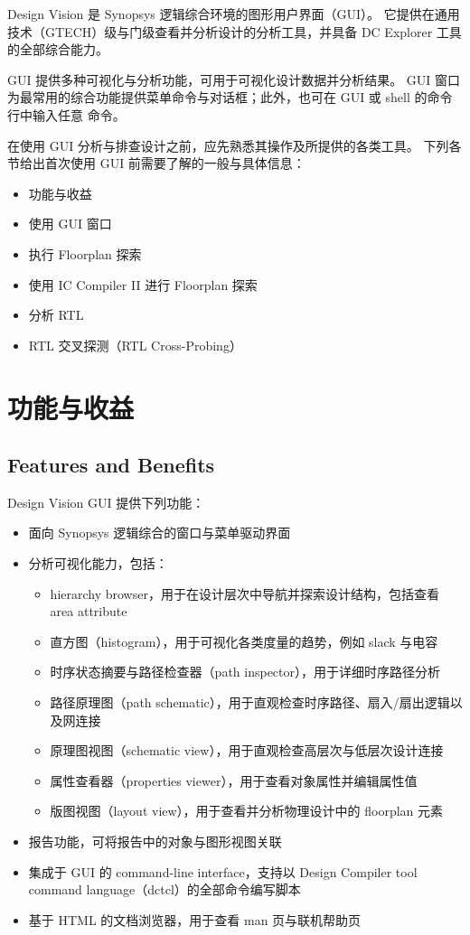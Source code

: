 \label{chap:gui}

Design Vision 是 Synopsys 逻辑综合环境的图形用户界面（GUI）。
它提供在通用技术（GTECH）级与门级查看并分析设计的分析工具，并具备 DC Explorer 工具的全部综合能力。

GUI 提供多种可视化与分析功能，可用于可视化设计数据并分析结果。
GUI 窗口为最常用的综合功能提供菜单命令与对话框；此外，也可在 GUI 或 shell 的命令行中输入任意  命令。

在使用 GUI 分析与排查设计之前，应先熟悉其操作及所提供的各类工具。
下列各节给出首次使用 GUI 前需要了解的一般与具体信息：
\begin{itemize}
  \item 功能与收益
  \item 使用 GUI 窗口
  \item 执行 Floorplan 探索
  \item 使用 IC Compiler II 进行 Floorplan 探索
  \item 分析 RTL
  \item RTL 交叉探测（RTL Cross-Probing）
\end{itemize}

\section{功能与收益}
\subsection*{Features and Benefits}

Design Vision GUI 提供下列功能：
\begin{itemize}
  \item 面向 Synopsys 逻辑综合的窗口与菜单驱动界面
  \item 分析可视化能力，包括：
  \begin{itemize}
    \item hierarchy browser，用于在设计层次中导航并探索设计结构，包括查看 area attribute
    \item 直方图（histogram），用于可视化各类度量的趋势，例如 slack 与电容
    \item 时序状态摘要与路径检查器（path inspector），用于详细时序路径分析
    \item 路径原理图（path schematic），用于直观检查时序路径、扇入/扇出逻辑以及网连接
    \item 原理图视图（schematic view），用于直观检查高层次与低层次设计连接
    \item 属性查看器（properties viewer），用于查看对象属性并编辑属性值
    \item 版图视图（layout view），用于查看并分析物理设计中的 floorplan 元素
  \end{itemize}
  \item 报告功能，可将报告中的对象与图形视图关联
  \item 集成于 GUI 的 command-line interface，支持以 Design Compiler tool command language（dctcl）的全部命令编写脚本
  \item 基于 HTML 的文档浏览器，用于查看 man 页与联机帮助页
\end{itemize}


